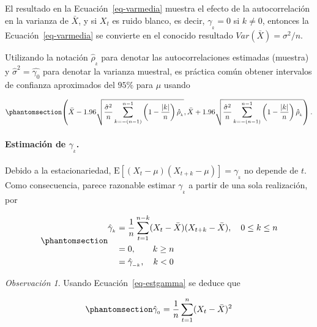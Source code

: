 \documentclass[
  us-letterpaper,
]{scrreprt}
\let\oldparagraph\paragraph
\renewcommand{\paragraph}[1]{\oldparagraph{#1}\mbox{}}
\theoremstyle{plain}
\theoremstyle{definition}
\theoremstyle{plain}
\theoremstyle{definition}
\theoremstyle{remark}
\newtheorem*{remark}{Observación}
\begin{document}
El resultado en la Ecuación~\ref{eq-varmedia} muestra el efecto de la
autocorrelación en la varianza de \(\bar X\), y si \(X_t\) es ruido
blanco, es decir, \(\gamma_{_{k}} = 0\) si \(k \ne 0\), entonces la
Ecuación~\ref{eq-varmedia} se convierte en el conocido resultado
\(Var(\bar X) = \sigma^2/n\).

Utilizando la notación \(\hat \rho_{_k}\) para denotar las
autocorrelaciones estimadas (muestra) y \(\hat\sigma^2=\hat{\gamma_0}\)
para denotar la varianza muestral, es práctica común obtener intervalos
de confianza aproximados del \(95\%\) para \(\mu\) usando

\begin{equation}\phantomsection\label{eq-iconf}{
\left(\bar X- 1.96\sqrt{\frac{\hat\sigma^2}{n}\sum_{k=-(n-1)}^{n-1}\left(1-\frac{|k|}{n}\right)\hat\rho_{_k}}, \bar X+ 1.96\sqrt{\frac{\hat\sigma^2}{n}\sum_{k=-(n-1)}^{n-1}\left(1-\frac{|k|}{n}\right)\hat\rho_{_k}}\right).
}\end{equation}

\paragraph{\texorpdfstring{Estimación de
\(\gamma_{_k}\).}{Estimación de \textbackslash gamma\_\{\_k\}.}}\label{estimaciuxf3n-de-gamma__k.}

Debido a la estacionariedad,
\(\mathrm E[(X_t − \mu)(X_{t+k} − \mu)] = \gamma_{_k}\) no depende de
\(t.\) Como consecuencia, parece razonable estimar \(\gamma_{_k}\) a
partir de una sola realización, por

\begin{equation}\phantomsection\label{eq-estgamma}{
\begin{split}\hat{\gamma}_{_k}&= \frac{1}{n}\sum_{t=1}^{n-k}(X_t-\bar X)(X_{t+k}-\bar X), \quad 0\leq k\leq n\\
&=0,\qquad k\ge n\\
&=\hat{\gamma}_{_{-k}},\quad k<0\end{split}
}\end{equation}

\begin{remark}
Usando Ecuación~\ref{eq-estgamma} se deduce que

\begin{equation}\phantomsection\label{eq-hatgamma0}{
\hat{\gamma}_{_0}= \frac{1}{n}\sum_{t=1}^{n}(X_t-\bar X)^2
}\end{equation}
\end{remark}
\end{document}

